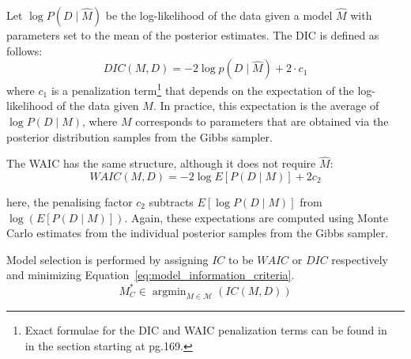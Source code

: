 \documentclass[letterpaper]{article} %
\newcommand{\citename}[1]{\citeauthor{#1}~\shortcite{#1}}
\DeclareMathOperator{\argmin}{argmin}
\begin{document}
Let $ \log P( D \mid \hat{M} )$ be the log-likelihood of the data given a model $\hat{M}$ with parameters set to the mean of the posterior estimates. The DIC is defined as follows:
\begin{equation}
    \label{eq:dic_formula}
    DIC (M, D) = -2 \log p(D \mid \hat{M}) + 2\cdot c_1
\end{equation}
where $c_1$ is a penalization term\footnote{Exact formulae for the DIC and WAIC penalization terms can be found in \citename{gelman2013bayesian} in the section starting at pg.169.} that depends on
the expectation of the log-likelihood of the data given $M$.  In practice, this expectation is the average of $\log P(D\mid M)$, where $M$ corresponds to parameters that are obtained via the posterior distribution samples from the Gibbs sampler.

The WAIC has the same structure, although it does not require $\hat{M}$:
\begin{equation}
    \label{eq:waic_formula}
    WAIC (M ,D) = - 2 \log E[ P( D \mid M ) ] + 2c_2
\end{equation}

\noindent here, the penalising factor $c_2$
subtracts $E[ \log P (D \mid M )]$ from $\log\left( E[ P ( D \mid M )]\right)$.
Again, these expectations are computed using Monte Carlo estimates from the individual posterior samples from the Gibbs sampler.

Model selection is performed by assigning $IC$ to be $WAIC$ or $DIC$ respectively and minimizing Equation~\ref{eq:model_information_criteria}.
\begin{equation}
    \label{eq:model_information_criteria}
    M^*_C \in \argmin_{M \in \mathcal{M}}(IC(M, D))
\end{equation}
\end{document}
